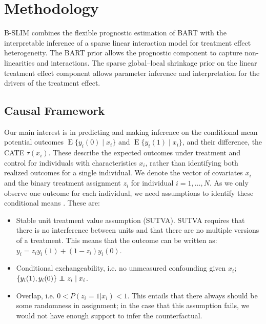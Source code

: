 \documentclass[12pt]{article}
\newcommand\independent{\protect\mathpalette{\protect\independenT}{\perp}}
\def\independenT#1#2{\mathrel{\rlap{$#1#2$}\mkern2mu{#1#2}}}
\begin{document}
\section{Methodology}
\label{sec:method}
B-SLIM combines the flexible prognostic estimation of BART with the interpretable inference of a sparse linear interaction model for treatment effect heterogeneity. The BART prior allows the prognostic component to capture non-linearities and interactions. The sparse global--local shrinkage prior on the linear treatment effect component allows parameter inference and interpretation for the drivers of the treatment effect.

\subsection{Causal Framework}
Our main interest is in predicting and making inference on the conditional mean potential outcomes $\operatorname{E}\{y_i(0)\mid x_i\}$ and $\operatorname{E}\{y_i(1)\mid x_i\}$, and their difference, the CATE $\tau(x_i)$. These describe the expected outcomes under treatment and control for individuals with characteristics $x_i$, rather than identifying both realized outcomes for a single individual. We denote the vector of covariates $x_i$ and the binary treatment assignment $z_i$ for individual $i=1,\ldots,N$. As we only observe one outcome for each individual, we need assumptions to identify these conditional means \citep{imbens2015causal}. These are:
\begin{itemize}
    \item Stable unit treatment value assumption (SUTVA). SUTVA requires that there is no interference between units and that there are no multiple versions of a treatment. This means that the outcome can be written as: $y_i = z_iy_i(1) + (1-z_i)y_i(0)$.
    \item Conditional exchangeability, i.e. no unmeasured confounding given $x_i$; $\{y_i(1),y_i(0)\} \independent z_i \mid x_i$.
    \item Overlap, i.e. $ 0 < P(z_i = 1 | x_i) < 1$. This entails that there always should be some randomness in assignment; in the case that this assumption fails, we would not have enough support to infer the counterfactual.
\end{itemize}
\end{document}
